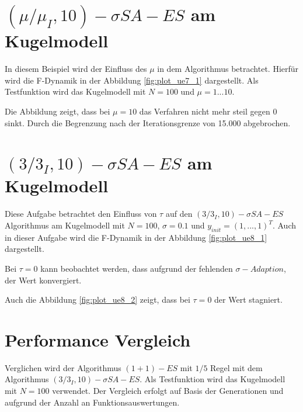 \setcounter{chapter}{6}

\chapter{$(\mu/\mu_I,10)-\sigma SA-ES$ am Kugelmodell}

In diesem Beispiel wird der Einfluss des $\mu$ in dem Algorithmus betrachtet. Hierfür wird die F-Dynamik in der Abbildung \ref{fig:plot_ue7_1} dargestellt. Als Testfunktion wird das Kugelmodell mit $N=100$ und $\mu=1...10$.


Die Abbildung zeigt, dass bei $\mu=10$ das Verfahren nicht mehr steil gegen 0 sinkt. Durch die Begrenzung nach der Iterationsgrenze von 15.000 abgebrochen.

\chapter{$(3/3_I,10)-\sigma SA-ES$ am Kugelmodell}

Diese Aufgabe betrachtet den Einfluss von $\tau$ auf den $(3/3_I,10)-\sigma SA-ES$ Algorithmus am Kugelmodell mit $N=100$, $\sigma=0.1$ und $y_{init}=(1,...,1)^T$. Auch in dieser Aufgabe wird die F-Dynamik in der Abbildung \ref{fig:plot_ue8_1} dargestellt.


Bei $\tau=0$ kann beobachtet werden, dass aufgrund der fehlenden $\sigma - Adaption$, der Wert konvergiert.


Auch die Abbildung \ref{fig:plot_ue8_2} zeigt, dass bei $\tau=0$ der Wert stagniert.

\chapter{Performance Vergleich}

Verglichen wird der Algorithmus $(1+1)-ES$ mit $1/5$ Regel mit dem Algorithmus $(3/3_I,10)-\sigma SA-ES$. Als Testfunktion wird das Kugelmodell mit $N=100$ verwendet. Der Vergleich erfolgt auf Basis der Generationen und aufgrund der Anzahl an Funktionsauswertungen.\\

